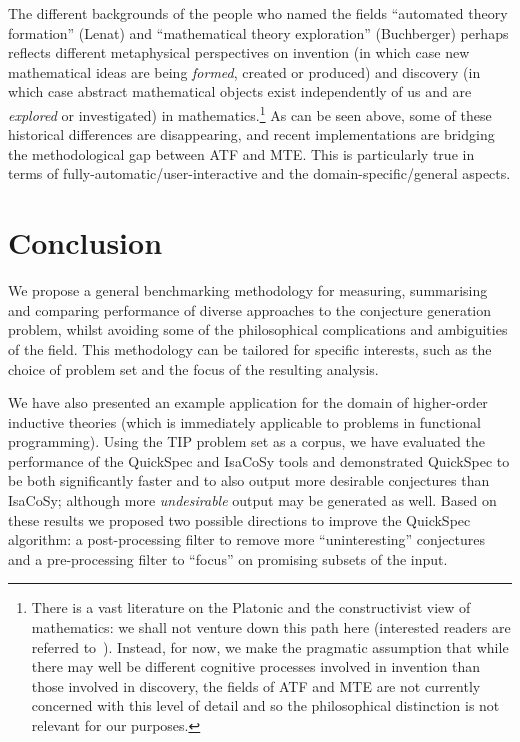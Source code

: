 The different backgrounds of the people who named the fields
``automated theory formation'' (Lenat) and ``mathematical theory
exploration'' (Buchberger) perhaps reflects different metaphysical
perspectives on invention (in which case new mathematical ideas are
being {\em formed}, created or produced) and discovery (in which case
abstract mathematical objects exist independently of us and are {\em
  explored} or investigated) in mathematics.\footnote{There is a vast
  literature on the Platonic and the constructivist view of
  mathematics: we shall not venture down this path here (interested
  readers are referred to~\cite{hersh:97,shapiro}). Instead, for now,
  we make the pragmatic assumption that while there may well be
  different cognitive processes involved in invention than those
  involved in discovery, the fields of ATF and MTE are not currently
  concerned with this level of detail and so the philosophical
  distinction is not relevant for our purposes.} As can be seen above,
some of these historical differences are disappearing, and recent
implementations are bridging the methodological gap between ATF and MTE. This is
particularly true in terms of fully-automatic/user-interactive and the
domain-specific/general aspects.

\section{Conclusion}
\label{sec:conclusion}

We propose a general benchmarking methodology for measuring, summarising and
comparing performance of diverse approaches to the conjecture generation
problem, whilst avoiding some of the philosophical complications and ambiguities
of the field. This methodology can be tailored for specific interests, such as
the choice of problem set and the focus of the resulting analysis.

We have also presented an example application for the domain of higher-order
inductive theories (which is immediately applicable to problems in functional
programming). Using the TIP problem set as a corpus, we have evaluated the
performance of the QuickSpec and IsaCoSy tools and demonstrated QuickSpec to be
both significantly faster and to also output more desirable conjectures than
IsaCoSy; although more \emph{undesirable} output may be generated as well. Based
on these results we proposed two possible directions to improve the QuickSpec
algorithm: a post-processing filter to remove more ``uninteresting'' conjectures
and a pre-processing filter to ``focus'' on promising subsets of the input.

